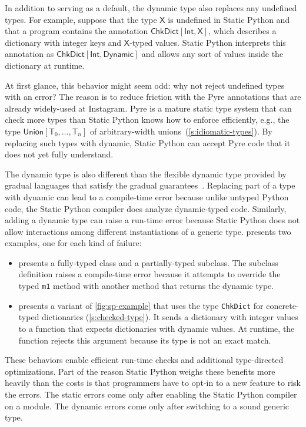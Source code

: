 \documentclass[english,cleveref,submission]{programming}
\newcommand{\SP}{Static Python}
\newcommand{\code}[1]{\texttt{#1}}
\newcommand{\typefont}[1]{\mathsf{#1}}
\newcommand{\paramtype}[2]{#1[#2]}
\newcommand{\sptype}{\typefont{T}}
\newcommand{\sptX}{\typefont{X}} %
\newcommand{\sptint}{\typefont{Int}}
\newcommand{\sptdyn}{\typefont{Dynamic}}
\newcommand{\sptunion}[1]{\paramtype{\typefont{Union}}{#1}}
\newcommand{\sptchkdict}[2]{\paramtype{\typefont{ChkDict}}{#1, #2}}
\begin{document}
In addition to serving as a default, the dynamic type also replaces any undefined types.
For example, suppose that the type $\sptX{}$ is undefined in \SP{} and that a
program contains the annotation $\sptchkdict{\sptint}{\sptX{}}$, which describes a
dictionary with integer keys and $\sptX{}$-typed values.
\SP{} interprets this annotation as $\sptchkdict{\sptint}{\sptdyn}$ and allows any sort
of values inside the dictionary at runtime.

At first glance, this behavior might seem odd: why not reject undefined types with an error?
The reason is to reduce friction with the Pyre annotations that are already
widely-used at Instagram.
Pyre is a mature static type system that can check more types than \SP{} knows how to enforce
efficiently, e.g., the type $\sptunion{\sptype_0, \ldots, \sptype_n}$ of arbitrary-width unions~(\cref{s:idiomatic-types}).
By replacing such types with dynamic, \SP{} can accept Pyre code that it does not yet fully understand.

The dynamic type is also different than the flexible dynamic type provided
by gradual languages that satisfy the gradual guarantees~\cite{svcb-snapl-2015}.
Replacing part of a type with dynamic can lead to a compile-time error because
unlike untyped Python code, the \SP{} compiler does analyze dynamic-typed code.
Similarly, adding a dynamic type can raise a run-time error because
\SP{} does not allow interactions among different instantiations of a generic type.
 presents two examples, one for each kind of failure:
\begin{itemize}
  \item
     presents a fully-typed class and a partially-typed subclass.
    The subclass definition raises a compile-time error because it attempts to override
    the typed \code{m1} method with another method that returns the dynamic type.

  \item
     presents a variant of \cref{fig:sp-example} that
    uses the type \code{ChkDict} for concrete-typed dictionaries (\cref{s:checked-type}).
    It sends a dictionary with integer values to a function that expects
    dictionaries with dynamic values.
    At runtime, the function rejects this argument because its type is not an
    exact match.
\end{itemize}
These behaviors enable efficient run-time checks and additional type-directed
optimizations.
Part of the reason \SP{} weighs these benefits more heavily than the costs
is that programmers have to opt-in to a new feature to risk the errors.
The static errors come only after enabling the \SP{} compiler on a module.
The dynamic errors come only after switching to a sound generic type.
\end{document}
